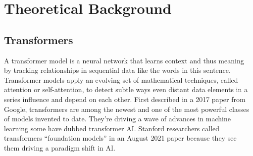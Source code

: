 \chapter{Theoretical Background}
\section{Transformers}
        A transformer model is a neural network that learns context and thus meaning by tracking relationships in sequential data like the words in this sentence.
        Transformer models apply an evolving set of mathematical techniques, called attention or self-attention, to detect subtle ways even distant data elements in a series influence and depend on each other.
        First described in a 2017 paper from Google\cite{vaswani2023attention}, transformers are among the newest and one of the most powerful classes of models invented to date. They’re driving a wave of advances in machine learning some have dubbed transformer AI.
        Stanford researchers called transformers “foundation models” in an August 2021 paper\cite{bommasani2021opportunities} because they see them driving a paradigm shift in AI.

        \begin{figure}[hbt!]
        \end{figure}

